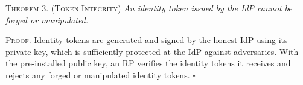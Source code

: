 
\newc
\vspace{3mm}
\noindent\textsc{Theorem 3. (Token Integrity)} {\em An identity token issued by the IdP cannot be forged or manipulated.}



\vspace{0.75mm}
\noindent \textsc{Proof.} Identity tokens are generated and signed by the honest IdP using its private key, which is sufficiently protected at the IdP against adversaries.
With the pre-installed public key, an RP verifies the identity tokens it receives and rejects any forged or manipulated identity tokens. \hfill $\square$




